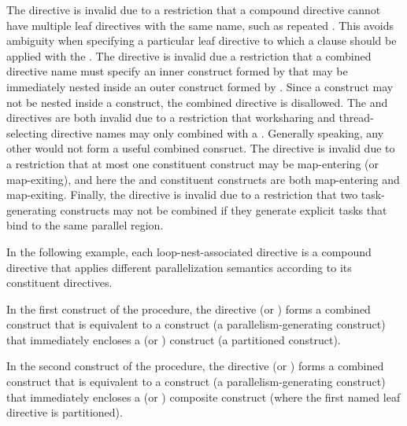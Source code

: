 The  directive is invalid due to a restriction
that a compound directive cannot have multiple leaf directives with the same
name, such as repeated . This avoids ambiguity when specifying a
particular leaf directive to which a clause should be applied with the
. The  directive is invalid
due a restriction that a combined directive name must specify an inner
construct formed by  that may be immediately nested
inside an outer construct formed by . Since a
 construct may not be nested inside a  construct,
the combined directive is disallowed. The  and
 directives are both invalid due to a restriction that
worksharing and thread-selecting directive names may only combined with a
 . Generally speaking, any other
 would not form a useful combined consruct. The
 directive is invalid due to a restriction
that at most one constituent construct may be map-entering (or map-exiting),
and here the  and  constituent constructs are
both map-entering and map-exiting. Finally, the  directive
is invalid due to a restriction that two task-generating constructs may not be
combined if they generate explicit tasks that bind to the same parallel region.


In the following example, each loop-nest-associated directive is a compound
directive that applies different parallelization semantics according to its
constituent directives.

In the first construct of the  procedure, the directive
 (or ) forms a combined construct that
is equivalent to a  construct (a parallelism-generating
construct) that immediately encloses a  (or ) construct
(a partitioned construct).

In the second construct of the procedure, the directive  (or ) forms a combined construct that is
equivalent to a  construct (a parallelism-generating
construct) that immediately encloses a  (or )
composite construct (where the first named leaf directive is partitioned).

